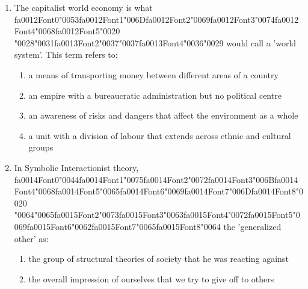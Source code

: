 \documentclass[12pt]{article}
\begin{document}
\begin{enumerate}[label=\arabic*.]
\begin{enumerate}[label=(\alph*)]
    \item absolute poverty
    \item relative poverty
    \item vertical mobility
    \item horizontal mobility
\end{enumerate}
\item The capitalist world economy is what {\csname fa0012Font0\endcsname\char"0053}{\csname fa0012Font1\endcsname\char"006D}{\csname fa0012Font2\endcsname\char"0069}{\csname fa0012Font3\endcsname\char"0074}{\csname fa0012Font4\endcsname\char"0068}{\csname fa0012Font5\endcsname\char"0020} {\char"0028}{\char"0031}{\csname fa0013Font2\endcsname\char"0037}{\char"0037}{\csname fa0013Font4\endcsname\char"0036}{\char"0029} would call a 'world system'. This term refers to:
\begin{enumerate}[label=(\alph*)]
    \item a means of transporting money between different areas of a country
    \item an empire with a bureaucratic administration but no political centre
    \item an awareness of risks and dangers that affect the environment as a whole
    \item a unit with a division of labour that extends across ethnic and cultural groups
\end{enumerate}
\item In Symbolic Interactionist theory, {\csname fa0014Font0\endcsname\char"0044}{\csname fa0014Font1\endcsname\char"0075}{\csname fa0014Font2\endcsname\char"0072}{\csname fa0014Font3\endcsname\char"006B}{\csname fa0014Font4\endcsname\char"0068}{\csname fa0014Font5\endcsname\char"0065}{\csname fa0014Font6\endcsname\char"0069}{\csname fa0014Font7\endcsname\char"006D}{\csname fa0014Font8\endcsname\char"0020} {\char"0064}{\char"0065}{\csname fa0015Font2\endcsname\char"0073}{\csname fa0015Font3\endcsname\char"0063}{\csname fa0015Font4\endcsname\char"0072}{\csname fa0015Font5\endcsname\char"0069}{\csname fa0015Font6\endcsname\char"0062}{\csname fa0015Font7\endcsname\char"0065}{\csname fa0015Font8\endcsname\char"0064} the 'generalized other' as:
\begin{enumerate}[label=(\alph*)]
    \item the group of structural theories of society that he was reacting against
    \item the overall impression of ourselves that we try to give off to others

\end{enumerate}
\end{enumerate}
\end{document}
